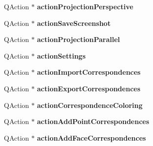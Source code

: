 \begin{DoxyCompactItemize}
\item 
\hypertarget{class_ui___shape_analyzer_a8b64aceebc3ea71ec4819a814665a8ce}{}Q\+Action $\ast$ {\bfseries action\+Projection\+Perspective}\label{class_ui___shape_analyzer_a8b64aceebc3ea71ec4819a814665a8ce}

\item 
\hypertarget{class_ui___shape_analyzer_a38ff900fcc75f5118a35225f71c117e2}{}Q\+Action $\ast$ {\bfseries action\+Save\+Screenshot}\label{class_ui___shape_analyzer_a38ff900fcc75f5118a35225f71c117e2}

\item 
\hypertarget{class_ui___shape_analyzer_a716f6f42cfcb5db12a22410cd3353291}{}Q\+Action $\ast$ {\bfseries action\+Projection\+Parallel}\label{class_ui___shape_analyzer_a716f6f42cfcb5db12a22410cd3353291}

\item 
\hypertarget{class_ui___shape_analyzer_a1ab5ab42a2c67208193dffff543342b8}{}Q\+Action $\ast$ {\bfseries action\+Settings}\label{class_ui___shape_analyzer_a1ab5ab42a2c67208193dffff543342b8}

\item 
\hypertarget{class_ui___shape_analyzer_a8be0ccd79d8ed341fd188aeb0b12a2f7}{}Q\+Action $\ast$ {\bfseries action\+Import\+Correspondences}\label{class_ui___shape_analyzer_a8be0ccd79d8ed341fd188aeb0b12a2f7}

\item 
\hypertarget{class_ui___shape_analyzer_acbb5a9099627d13bd1327207e0cc3af0}{}Q\+Action $\ast$ {\bfseries action\+Export\+Correspondences}\label{class_ui___shape_analyzer_acbb5a9099627d13bd1327207e0cc3af0}

\item 
\hypertarget{class_ui___shape_analyzer_a90c9bf14d89d6901a043ed620f8926cd}{}Q\+Action $\ast$ {\bfseries action\+Correspondence\+Coloring}\label{class_ui___shape_analyzer_a90c9bf14d89d6901a043ed620f8926cd}

\item 
\hypertarget{class_ui___shape_analyzer_a2ca63b6ac46a3a1ccc95b7a4430d3e4c}{}Q\+Action $\ast$ {\bfseries action\+Add\+Point\+Correspondences}\label{class_ui___shape_analyzer_a2ca63b6ac46a3a1ccc95b7a4430d3e4c}

\item 
\hypertarget{class_ui___shape_analyzer_aa03e6b30a3ec9ec5ac761c59ee2fab46}{}Q\+Action $\ast$ {\bfseries action\+Add\+Face\+Correspondences}\label{class_ui___shape_analyzer_aa03e6b30a3ec9ec5ac761c59ee2fab46}


\end{DoxyCompactItemize}
